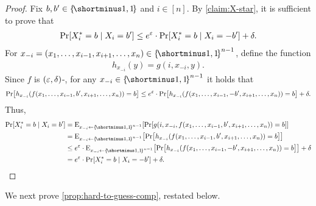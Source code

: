 \begin{proposition}
    \propHardToGuessInf
\end{proposition}
\begin{proof}
    
    Fix $b,b' \in \oo$ and $i \in [n]$. By \cref{claim:X-star}, it is sufficient to prove that
    \begin{align}\label{eq:X_i^*-goal}
        \pr{X_i^* = b \mid X_i = b'} \leq e^{\eps}\cdot \pr{X_i^* = b \mid X_i = -b'} + \delta.
    \end{align}
    For $x_{-i} = (x_1,\ldots,x_{i-1},x_{i+1},\ldots,x_n) \in \oo^{n-1}$, define the function
    \begin{align*}
        h_{x_{-i}}(y) = g(i,x_{-i},y).
    \end{align*}
    Since $f$ is $(\varepsilon,\delta)$-\DP, for any $x_{-i} \in \oo^{n-1}$ it holds that
    \begin{align*}
        \pr{h_{x_{-i}}(f(x_1,\ldots,x_{i-1}, b', x_{i+1},\ldots,x_n)) = b} \leq e^{\eps}\cdot \pr{h_{x_{-i}}(f(x_1,\ldots,x_{i-1}, -b', x_{i+1},\ldots,x_n)) = b} + \delta.
    \end{align*}
    Thus,
    \begin{align*}
        \pr{X_i^* = b \mid X_i = b'}
        &= \eex{x_{-i} \la \oo^{n-1}}{\pr{g(i,x_{-i}, f(x_1,\ldots,x_{i-1}, b', x_{i+1},\ldots,x_n)) = b }}\\
        &= \eex{x_{-i} \la \oo^{n-1}}{\pr{h_{x_{-i}}(f(x_1,\ldots,x_{i-1}, b', x_{i+1},\ldots,x_n)) = b}}\\
        &\leq e^{\eps}\cdot \eex{x_{-i} \la \oo^{n-1}}{\pr{h_{x_{-i}}(f(x_1,\ldots,x_{i-1}, -b', x_{i+1},\ldots,x_n)) = b}} + \delta\\
        &= e^{\eps}\cdot\pr{X_i^* = b \mid X_i = -b'}+ \delta.
    \end{align*}
\end{proof}


We next prove \cref{prop:hard-to-guess-comp}, restated below.

